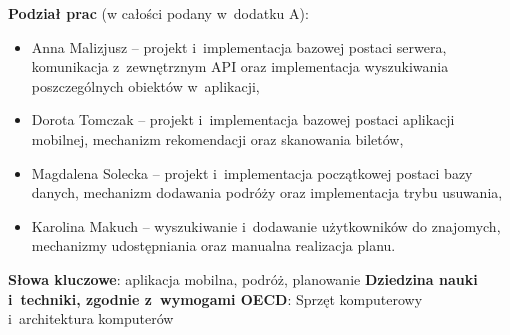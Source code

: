 \par \textbf{Podział prac} (w całości podany w~dodatku A):
\begin{itemize}
\item Anna Malizjusz --  projekt i~implementacja bazowej postaci serwera, komunikacja z~zewnętrznym API oraz implementacja wyszukiwania poszczególnych obiektów w~aplikacji,
\item Dorota Tomczak -- projekt i~implementacja bazowej postaci aplikacji mobilnej, mechanizm rekomendacji oraz skanowania biletów,
\item Magdalena Solecka -- projekt i~implementacja początkowej postaci bazy danych, mechanizm dodawania podróży oraz implementacja trybu usuwania,
\item Karolina Makuch -- wyszukiwanie i~dodawanie użytkowników do znajomych, mechanizmy udostępniania oraz manualna realizacja planu.
\end{itemize}
\textbf{Słowa kluczowe}: aplikacja mobilna, podróż, planowanie
\newline\textbf{Dziedzina nauki i~techniki, zgodnie z~wymogami OECD}: Sprzęt komputerowy i~architektura komputerów
